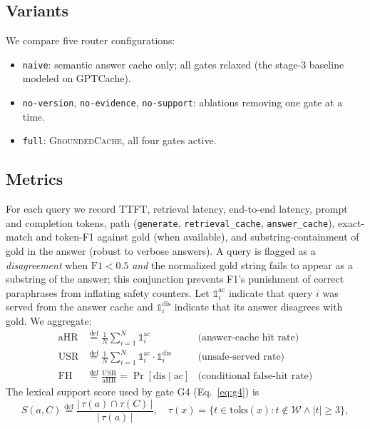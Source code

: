 \documentclass[11pt]{article}
\newcommand{\sys}{\textsc{GroundedCache}\xspace}
\newcommand{\eqdef}{\stackrel{\mathrm{def}}{=}}
\begin{document}
\subsection{Variants}
We compare five router configurations:
\begin{itemize}
  \item \texttt{naive}: semantic answer cache only; all gates relaxed (the
        stage-3 baseline modeled on GPTCache).
  \item \texttt{no-version}, \texttt{no-evidence}, \texttt{no-support}:
        ablations removing one gate at a time.
  \item \texttt{full}: \sys{}, all four gates active.
\end{itemize}

\subsection{Metrics}
For each query we record TTFT, retrieval latency, end-to-end latency, prompt
and completion tokens, path (\texttt{generate}, \texttt{retrieval\_cache},
\texttt{answer\_cache}), exact-match and token-F1 against gold (when
available), and substring-containment of gold in the answer (robust to
verbose answers). A query is flagged as a \emph{disagreement} when
$\text{F1}<0.5$ \emph{and} the normalized gold string fails to appear as a
substring of the answer; this conjunction prevents F1's punishment of
correct paraphrases from inflating safety counters. Let
$\mathbb{1}_i^{\mathrm{ac}}$ indicate that query $i$ was served from
the answer cache and $\mathbb{1}_i^{\mathrm{dis}}$ indicate that its
answer disagrees with gold. We aggregate:
\begin{align}
\mathrm{aHR}     &\eqdef \frac{1}{N}\sum_{i=1}^{N} \mathbb{1}_i^{\mathrm{ac}}
                 & \text{(answer-cache hit rate)} \label{eq:ahr}\\
\mathrm{USR}     &\eqdef \frac{1}{N}\sum_{i=1}^{N} \mathbb{1}_i^{\mathrm{ac}} \cdot \mathbb{1}_i^{\mathrm{dis}}
                 & \text{(unsafe-served rate)} \label{eq:usr}\\
\mathrm{FH}      &\eqdef \frac{\mathrm{USR}}{\mathrm{aHR}} = \Pr[\mathrm{dis} \mid \mathrm{ac}]
                 & \text{(conditional false-hit rate)} \label{eq:fh}
\end{align}
The lexical support score used by gate G4 (Eq.~\ref{eq:g4}) is
\begin{equation}
S(a, C) \eqdef \frac{|\,\tau(a) \cap \tau(C)\,|}{|\,\tau(a)\,|},
\quad \tau(x) = \{t \in \mathrm{toks}(x) : t \notin \mathcal{W} \wedge |t| \ge 3\},
\label{eq:support}
\end{equation}
\end{document}
